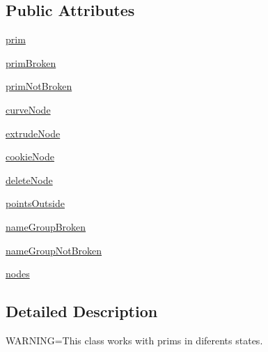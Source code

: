 \subsection*{Public Attributes}
\begin{DoxyCompactItemize}
\item 
\hyperlink{classdestruction_1_1_prim_divided_1_1_prim_divided_af1a902f9097130126ec7e7a4f20ee682}{prim}
\item 
\hyperlink{classdestruction_1_1_prim_divided_1_1_prim_divided_a9380dd498679f3bfd281233c774b9388}{prim\-Broken}
\item 
\hyperlink{classdestruction_1_1_prim_divided_1_1_prim_divided_ab45b1e6348e16b4d5b7c853aedcd15e4}{prim\-Not\-Broken}
\item 
\hyperlink{classdestruction_1_1_prim_divided_1_1_prim_divided_a9ffd0988ec8b1e203ce03b5e6e078833}{curve\-Node}
\item 
\hyperlink{classdestruction_1_1_prim_divided_1_1_prim_divided_a05732c2980ea65970284995cd3fe41b7}{extrude\-Node}
\item 
\hyperlink{classdestruction_1_1_prim_divided_1_1_prim_divided_a0f807302c7722472bac8ccb14899d88d}{cookie\-Node}
\item 
\hyperlink{classdestruction_1_1_prim_divided_1_1_prim_divided_a783ffcd9d29122fb7f3cf61f9bd69cb8}{delete\-Node}
\item 
\hyperlink{classdestruction_1_1_prim_divided_1_1_prim_divided_a8da5aeb83214af714199925497751326}{points\-Outside}
\item 
\hyperlink{classdestruction_1_1_prim_divided_1_1_prim_divided_a258ea87be3f117573e972bcc5e5c8351}{name\-Group\-Broken}
\item 
\hyperlink{classdestruction_1_1_prim_divided_1_1_prim_divided_af70c7e9b34086cead6c6ff9c1b35eaec}{name\-Group\-Not\-Broken}
\item 
\hyperlink{classdestruction_1_1_prim_divided_1_1_prim_divided_aef698b3466adf6e94913bbce24c350eb}{nodes}
\end{DoxyCompactItemize}


\subsection{Detailed Description}
\begin{DoxyVerb}WARNING=This class works with prims in diferents states.
\end{DoxyVerb}
 

